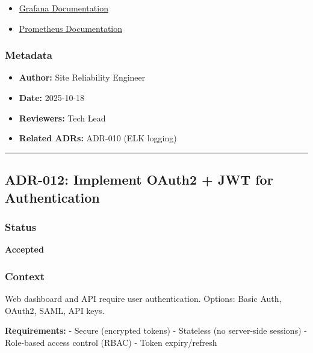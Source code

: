 \documentclass[
]{article}
\providecommand{\tightlist}{%
  \setlength{\itemsep}{0pt}\setlength{\parskip}{0pt}}
\begin{document}
\begin{itemize}
\tightlist
\item
  \href{https://grafana.com/docs/}{Grafana Documentation}
\item
  \href{https://prometheus.io/docs/}{Prometheus Documentation}
\end{itemize}

\hypertarget{metadata-10}{%
\subsubsection{Metadata}\label{metadata-10}}

\begin{itemize}
\tightlist
\item
  \textbf{Author:} Site Reliability Engineer
\item
  \textbf{Date:} 2025-10-18
\item
  \textbf{Reviewers:} Tech Lead
\item
  \textbf{Related ADRs:} ADR-010 (ELK logging)
\end{itemize}

\begin{center}\rule{0.5\linewidth}{0.5pt}\end{center}

\hypertarget{adr-012-implement-oauth2-jwt-for-authentication}{%
\subsection{ADR-012: Implement OAuth2 + JWT for
Authentication}\label{adr-012-implement-oauth2-jwt-for-authentication}}

\hypertarget{status-11}{%
\subsubsection{Status}\label{status-11}}

\textbf{Accepted}

\hypertarget{context-11}{%
\subsubsection{Context}\label{context-11}}

Web dashboard and API require user authentication. Options: Basic Auth,
OAuth2, SAML, API keys.

\textbf{Requirements:} - Secure (encrypted tokens) - Stateless (no
server-side sessions) - Role-based access control (RBAC) - Token
expiry/refresh
\end{document}
